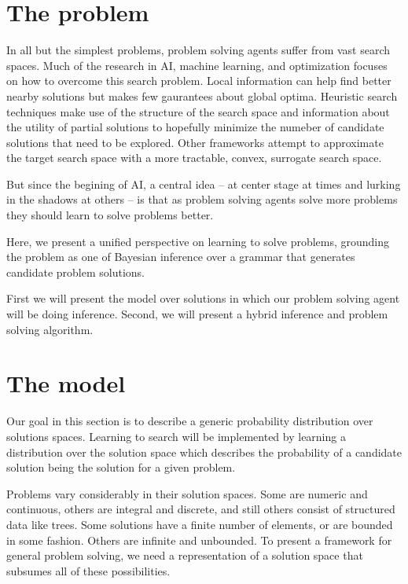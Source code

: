 \documentclass{article}
\begin{document}
\newcommand{\learner}{\emph{Learner }}
\newcommand{\evaluator}{\emph{Evaluator }}
\section{The problem}
In all but the simplest problems, problem solving agents suffer from vast
search spaces. Much of the research in AI, machine learning, and optimization
focuses on how to overcome this search problem. Local information can help find
better nearby solutions but makes few gaurantees about global optima. Heuristic
search techniques make use of the structure of the search space and information
about the utility of partial solutions to hopefully minimize the numeber of
candidate solutions that need to be explored. Other frameworks attempt to
approximate the target search space with a more tractable, convex, surrogate
search space. 

But since the begining of AI, a central idea -- at center stage at times and
lurking in the shadows at others -- is that as problem solving agents solve
more problems they should learn to solve problems better.

Here, we present a unified perspective on learning to solve problems, grounding the
problem as one of Bayesian inference over a grammar that generates candidate
problem solutions. 


First we will present the model over solutions in which our problem solving
agent will be doing inference. Second, we will present a hybrid inference and
problem solving algorithm. 

\section{The model}
Our goal in this section is to describe a generic probability distribution over
solutions spaces. Learning to search will be implemented by learning a
distribution over the solution space which describes the probability of a 
candidate solution being the solution for a given problem. 

Problems vary considerably in their solution spaces. Some are numeric and
continuous, others are integral and discrete, and still others consist of
structured data like trees. Some solutions have a finite number of elements, or
are bounded in some fashion. Others are infinite and unbounded. To present a
framework for general problem solving, we need a representation of a solution
space that subsumes all of these possibilities. 
\end{document}
